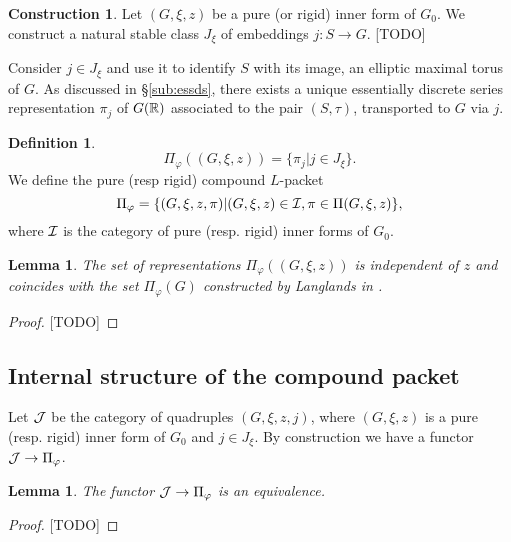 \documentclass{article}
\newtheorem{lem}[thm]{Lemma}
\theoremstyle{definition}
\newtheorem{dfn}[thm]{Definition}
\newtheorem{cns}[thm]{Construction}
\numberwithin{equation}{section}
\renewcommand{\-}{\hyp{}}
\newcommand{\warn}[1]{{\leavevmode\color{red}[#1]}}
\begin{document}
\begin{cns} \label{cns:stj}
Let $(G,\xi,z)$ be a pure (or rigid) inner form of $G_0$. We construct a natural stable class $J_\xi$ of embeddings $j : S \to G$. \warn{TODO}
\end{cns}


Consider $j \in J_\xi$ and use it to identify $S$ with its image, an elliptic maximal torus of $G$. As discussed in \S\ref{sub:essds}, there exists a unique essentially discrete series representation $\pi_j$ of $G(\mathbb{R})$ associated to the pair $(S,\tau)$, transported to $G$ via $j$.




\begin{dfn}
\[ \Pi_\varphi((G,\xi,z)) = \{\pi_j|j \in J_\xi\}. \]
We define the pure (resp rigid) compound $L$-packet
\[ \Pi_\varphi = \{(G,\xi,z,\pi)|(G,\xi,z) \in \mathcal{I}, \pi \in \Pi(G,\xi,z)\}, \]
where $\mathcal{I}$ is the category of pure (resp. rigid) inner forms of $G_0$.
\end{dfn}

\begin{lem}
The set of representations $\Pi_\varphi((G,\xi,z))$ is independent of $z$ and coincides with the set $\Pi_\varphi(G)$ constructed by Langlands in \cite[\S3]{Lan89}.
\end{lem}
\begin{proof}
\warn{TODO}
\end{proof}

\subsection{Internal structure of the compound packet} \label{sub:intstr}

Let $\mathcal{J}$ be the category of quadruples $(G,\xi,z,j)$, where $(G,\xi,z)$ is a pure (resp. rigid) inner form of $G_0$ and $j \in J_\xi$. By construction we have a functor $\mathcal{J} \to \Pi_\varphi$.

\begin{lem} \label{lem:intstr}
The functor $\mathcal{J} \to \Pi_\varphi$ is an equivalence.
\end{lem}
\begin{proof}
\warn{TODO}
\end{proof}
\end{document}
